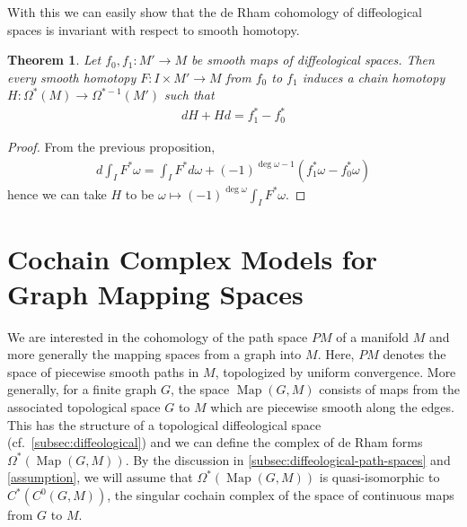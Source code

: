 \documentclass{scrartcl}
\theoremstyle{plain}
\newtheorem{theorem}{Theorem}[section]
\theoremstyle{definition}
\newtheorem{definition}[theorem]{Definition}
\DeclareMathOperator{\Map}{Map}
\begin{document}
With this we can easily show that the de Rham cohomology of diffeological spaces is invariant with respect to smooth homotopy.
\begin{theorem}
    Let $f_0, f_1\colon M'\to M$ be smooth maps of diffeological spaces. Then every smooth homotopy $F\colon I\times M'\to M$ from $f_0$ to $f_1$ induces a chain homotopy $H\colon \Omega^*(M)\to \Omega^{*-1}(M')$ such that 
    \begin{align*}
        dH + H d = f_1^* - f_0^*
    \end{align*}
\end{theorem}
\begin{proof}
    From the previous proposition,
    \begin{align*}
        d \int_I F^*\omega = \int_I F^*d\omega + (-1)^{\deg\omega - 1} (f_1^*\omega - f_0^*\omega)
    \end{align*}
    hence we can take $H$ to be $\omega\mapsto (-1)^{\deg\omega}\int_I F^*\omega$.
\end{proof}








\section{Cochain Complex Models for Graph Mapping Spaces}\label{sec:cochain-models}

We are interested in the cohomology of the path space $PM$ of a manifold $M$ and more generally the mapping spaces from a graph into $M$. Here, $PM$ denotes the space of piecewise smooth paths in $M$, topologized by uniform convergence. More generally, for a finite graph $G$, the space $\Map(G, M)$ consists of maps from the associated topological space $G$ to $M$ which are piecewise smooth along the edges. This has the structure of a topological diffeological space (cf.\ \cref{subsec:diffeological}) and we can define the complex of de Rham forms $\Omega^*(\Map(G, M))$. By the discussion in \cref{subsec:diffeological-path-spaces} and \cref{assumption}, we will assume that $\Omega^*(\Map(G, M))$ is quasi-isomorphic to $C^*(C^0(G, M))$, the singular cochain complex of the space of continuous maps from $G$ to $M$. 
\end{document}
